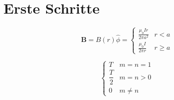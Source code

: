 \section{Erste Schritte } 


\begin{equation*}
\mathbf{B}=B(r) \hat{\phi}=\left\{\begin{array}{ll}{\frac{\mu_{0} I r}{2 \pi a^{2}}} & {r<a} \\ {\frac{\mu_{0} I}{2 \pi r}} & {r \geq a}\end{array}\right.
\end{equation*}


\begin{equation*}
\begin{cases}
{T} & {m=n=1} \\[1.0em]
{\dfrac{T}{2}} & {m=n>0} \\[1.0em]
{0} & {m \neq n}
\end{cases}
\end{equation*}